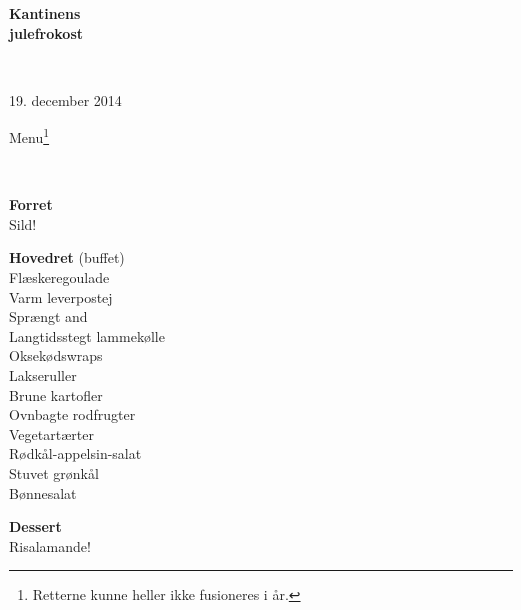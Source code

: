 \begin{center}
\begin{HUGE}
\textbf{Kantinens \\[3mm] julefrokost}
\end{HUGE}
\\[.6cm]
\begin{Large}
19. december 2014
\end{Large}
\end{center}
\vspace*{.01cm}
\begin{flushleft}
\begin{huge}
    Menu\footnote{Retterne kunne heller ikke fusioneres i år.}
\end{huge}
\\[.1cm]
\newcommand{\course}[1]{\vspace*{4mm} \textbf{#1} \vspace{1mm}}
{\small
\course{Forret}
\\ Sild!

\course{Hovedret} (buffet)
\\ Flæskeregoulade
\\ Varm leverpostej
\\ Sprængt and
\\ Langtidsstegt lammekølle
\\ Oksekødswraps
\\ Lakseruller
\\ Brune kartofler
\\ Ovnbagte rodfrugter
\\ Vegetartærter
\\ Rødkål-appelsin-salat
\\ Stuvet grønkål
\\ Bønnesalat

\course{Dessert}
\\ Risalamande!
}
\end{flushleft}
